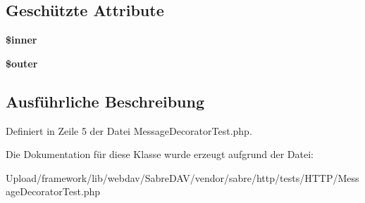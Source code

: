 \subsection*{Geschützte Attribute}
\begin{DoxyCompactItemize}
\item 
\mbox{\label{class_sabre_1_1_h_t_t_p_1_1_message_decorator_test_ae83d0bf3b4c2c80668d8588ababe7fe0}} 
{\bfseries \$inner}
\item 
\mbox{\label{class_sabre_1_1_h_t_t_p_1_1_message_decorator_test_a893943f338032ed0315a43820cd457ee}} 
{\bfseries \$outer}
\end{DoxyCompactItemize}


\subsection{Ausführliche Beschreibung}


Definiert in Zeile 5 der Datei Message\+Decorator\+Test.\+php.



Die Dokumentation für diese Klasse wurde erzeugt aufgrund der Datei\+:\begin{DoxyCompactItemize}
\item 
Upload/framework/lib/webdav/\+Sabre\+D\+A\+V/vendor/sabre/http/tests/\+H\+T\+T\+P/Message\+Decorator\+Test.\+php\end{DoxyCompactItemize}

